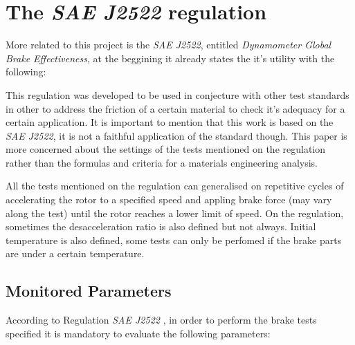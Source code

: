 \section{The \textit{SAE J2522} regulation}\label{the-sae-j2522-regulation}

		More related to this project is the \textit{SAE J2522}, entitled \textit{Dynamometer Global Brake Effectiveness}, at the beggining it already states the it's utility with the following:


		This regulation \cite{saej2522} was developed to be used in conjecture with other test standards in other to address the friction of a certain material to check it's adequacy for a certain application. It is important to mention that this work is based on the \textit{SAE J2522}, it is not a faithful application of the standard though. This paper is more concerned about the settings of the tests mentioned on the regulation rather than the formulas and criteria for a materials engineering analysis.
		\par
		All the tests mentioned on the regulation can generalised on repetitive cycles of accelerating the rotor to a specified speed and appling brake force (may vary along the test) until the rotor reaches a lower limit of speed. On the regulation, sometimes the desacceleration ratio is also defined but not always. Initial temperature is also defined, some tests can only be perfomed if the brake parts are under a certain temperature.

		\subsection{Monitored Parameters}\label{ssec:monitored-parameters}
			According to Regulation \textit{SAE J2522} \cite{saej2522}, in order to perform the brake tests specified it is mandatory to evaluate the following parameters:


